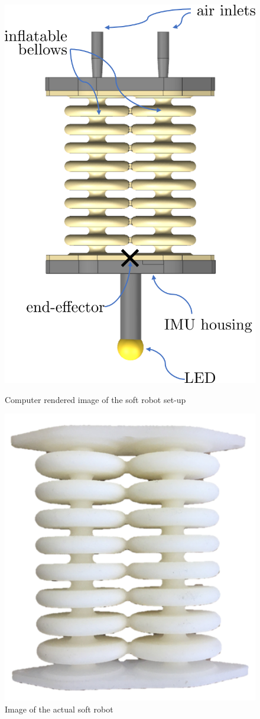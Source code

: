 \begin{figure}[H]
\centering
\begin{minipage}{.5\textwidth}
  \centering
  \includegraphics[width = 0.8\linewidth]{Figures/Chapter1/completesetup.png}
  \caption{Computer rendered image of the soft robot set-up }
  \label{fig:test1}
\end{minipage}%
\begin{minipage}{.5\textwidth}
  \centering
  \includegraphics[width =0.8\linewidth]{Figures/Chapter1/actuator.png}
  \vspace{50pt}
  \caption{Image of the actual soft robot}
  \label{fig:test2}
\end{minipage}
\end{figure}
